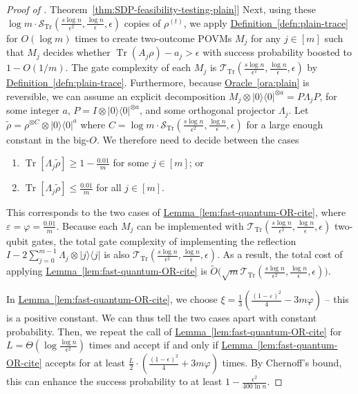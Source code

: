 \documentclass[a4paper,UKenglish,cleveref, autoref]{lipics-v2019}
\theoremstyle{remark}
\numberwithin{equation}{section}
\numberwithin{oracle}{section}
\numberwithin{remark}{section}
\newcommand{\ora}[1]{\hyperref[ora:#1]{Oracle~\ref*{ora:#1}}}
\newcommand{\thm}[1]{\hyperref[thm:#1]{Theorem~\ref*{thm:#1}}}
\newcommand{\defn}[1]{\hyperref[defn:#1]{Definition~\ref*{defn:#1}}}
\newcommand{\lem}[1]{\hyperref[lem:#1]{Lemma~\ref*{lem:#1}}}
\def\>{\rangle}
\def\<{\langle}
\newcommand{\range}[1]{[#1]}
\newcommand{\ket}[1]{|#1\rangle}
\newcommand{\bra}[1]{\langle#1|}
\newcommand{\proj}[1]{\ket{#1}\bra{#1}}
\DeclareMathOperator{\tr}{Tr}
\DeclareMathOperator{\Tr}{Tr}
\begin{document}
\begin{proof}[Proof of \thm{SDP-feasibility-testing-plain}]
Next, using these $\log m\cdot\mathcal{S}_{\tr}(\frac{s\log n}{\epsilon^{2}},\frac{\log n}{\epsilon},\epsilon)$ copies of $\rho^{(t)}$, we apply \defn{plain-trace} for $O(\log m)$ times to create two-outcome POVMs $M_j$ for any $j\in\range{m}$ such that $M_{j}$ decides whether $\tr(A_{j}\rho)-a_{j}>\epsilon$ with success probability boosted to $1-O(1/m)$. The gate complexity of each $M_{j}$ is $\mathcal{T}_{\tr}(\frac{s\log n}{\epsilon^{2}},\frac{\log n}{\epsilon},\epsilon)$ by \defn{plain-trace}. Furthermore, because \ora{plain} is reversible, we can assume an explicit decomposition $M_{j} \otimes \proj{0}^{\otimes a} = P \Lambda_{j} P$, for some integer $a$, $P = I \otimes \proj{0}^{\otimes a}$, and some orthogonal projector $\Lambda_{j}$. Let $\widetilde{\rho} = \rho^{\otimes C}\otimes\proj{0}^a$ where $C=\log m\cdot\mathcal{S}_{\tr}(\frac{s\log n}{\epsilon^{2}},\frac{\log n}{\epsilon},\epsilon)$ for a large enough constant in the big-$O$. We therefore need to decide between the cases
\begin{enumerate}
\item $\Tr[\Lambda_j\widetilde{\rho}]\geq 1-\frac{0.01}{m}$ for some $j\in\range{m}$; or
\item $\Tr[\Lambda_j\widetilde{\rho}]\leq \frac{0.01}{m}$ for all $j\in\range{m}$.
\end{enumerate}
This corresponds to the two cases of \lem{fast-quantum-OR-cite}, where $\varepsilon=\varphi=\frac{0.01}{m}$. Because each $M_{j}$ can be implemented with $\mathcal{T}_{\tr}(\frac{s\log n}{\epsilon^{2}},\frac{\log n}{\epsilon},\epsilon)$ two-qubit gates, the total gate complexity of implementing the reflection $I-2\sum_{j=0}^{m-1}\Lambda_{j}\otimes|j\>\<j|$ is also $\mathcal{T}_{\tr}(\frac{s\log n}{\epsilon^{2}},\frac{\log n}{\epsilon},\epsilon)$. As a result, the total cost of applying \lem{fast-quantum-OR-cite} is $\tilde{O}\big(\sqrt{m}\mathcal{T}_{\tr}(\frac{s\log n}{\epsilon^{2}},\frac{\log n}{\epsilon},\epsilon)\big)$.

In \lem{fast-quantum-OR-cite}, we choose $\xi=\frac{1}{3}(\frac{(1-\varepsilon)^{2}}{4}-3m\varphi)$ -- this is a positive constant. We can thus tell the two cases apart with constant probability. Then, we repeat the call of \lem{fast-quantum-OR-cite} for $L=\Theta(\log\frac{\log n}{\epsilon^{2}})$ times and accept if and only if \lem{fast-quantum-OR-cite} accepts for at least $\frac{L}{2}\cdot(\frac{(1-\epsilon)^{2}}{4}+3m\varphi)$ times. By Chernoff's bound, this can enhance the success probability to at least $1-\frac{\epsilon^{2}}{400\ln n}$.


\end{proof}
\end{document}
